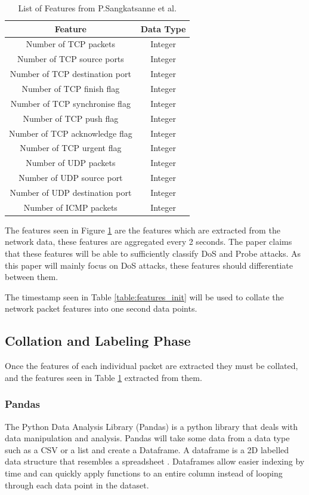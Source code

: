 \begin{table}[h]
 \centering
 \caption{List of Features from P.Sangkatsanne et al.}
 \label{table:features}
 \begin{tabular}{|c|c|}
 \hline
 \textbf{Feature}&\textbf{Data Type}\\
 \hline
 Number of TCP packets & Integer \\
 \hline
 Number of TCP source ports & Integer\\ 
 \hline
 Number of TCP destination port & Integer\\
 \hline
 Number of TCP finish flag & Integer\\
 \hline
 Number of TCP synchronise flag & Integer\\
 \hline
 Number of TCP push flag & Integer\\
 \hline
 Number of TCP acknowledge flag & Integer\\
 \hline
 Number of TCP urgent flag & Integer\\
 \hline
 Number of UDP packets & Integer\\
 \hline
 Number of UDP source port & Integer\\
 \hline
 Number of UDP destination port & Integer\\
 \hline
 Number of ICMP packets & Integer\\
 \hline
\end{tabular}
\end{table}

The features seen in Figure \ref{table:features} are the features which are extracted from the network data, these features are aggregated every 2 seconds. The paper claims that these features will be able to sufficiently classify DoS and Probe attacks. As this paper will mainly focus on DoS attacks, these features should differentiate between them.

The timestamp seen in Table \ref{table:features_init} will be used to collate the network packet features into one second data points. 
\subsection{Collation and Labeling Phase}
Once the features of each individual packet are extracted they must be collated, and the features seen in Table \ref{table:features} extracted from them.
\subsubsection{Pandas}
The Python Data Analysis Library (Pandas) is a python library that deals with data manipulation and analysis. Pandas will take some data from a data type such as a CSV or a list and create a Dataframe. A dataframe is a 2D labelled data structure that resembles a spreadsheet \cite{pandas_docs}. Dataframes allow easier indexing by time and can quickly apply functions to an entire column instead of looping through each data point in the dataset.

